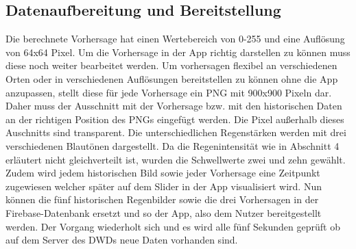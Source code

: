 \subsection{Datenaufbereitung und Bereitstellung}
Die berechnete Vorhersage hat einen Wertebereich von 0-255 und eine Auflösung von 64x64 Pixel.
Um die Vorhersage in der App richtig darstellen zu können muss diese noch weiter bearbeitet werden.
Um vorhersagen flexibel an verschiedenen Orten oder in verschiedenen Auflösungen bereitstellen zu können ohne die App anzupassen, stellt diese für jede Vorhersage ein PNG mit 900x900 Pixeln dar.
Daher muss der Ausschnitt mit der Vorhersage bzw. mit den historischen Daten an der richtigen Position des PNGs eingefügt werden.
Die Pixel außerhalb dieses Auschnitts sind transparent.
Die unterschiedlichen Regenstärken werden mit drei verschiedenen Blautönen dargestellt.
Da die Regenintensität wie in Abschnitt 4 erläutert nicht gleichverteilt ist, wurden die Schwellwerte zwei und zehn gewählt. 
Zudem wird jedem historischen Bild sowie jeder Vorhersage eine Zeitpunkt zugewiesen welcher später auf dem Slider in der App visualisiert wird.
Nun können die fünf historischen Regenbilder sowie die drei Vorhersagen in der Firebase-Datenbank ersetzt und so der App, also dem Nutzer bereitgestellt werden. 
Der Vorgang wiederholt sich und es wird alle fünf Sekunden geprüft ob auf dem Server des DWDs neue Daten vorhanden sind. 

